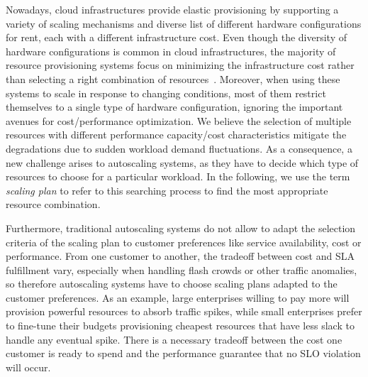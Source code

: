 Nowadays, cloud infrastructures provide elastic provisioning by supporting a variety of scaling mechanisms and diverse list of different hardware configurations for rent, each with a different infrastructure cost. Even though the diversity of hardware configurations is common in cloud infrastructures, the majority of resource provisioning systems focus on minimizing the infrastructure cost rather than selecting a right combination of resources~\cite{herbst_2013,urgaonkar_agile_2008,dejavu2012}. Moreover, when using these systems to scale in response to changing conditions, most of them restrict themselves to a single type of hardware configuration, ignoring the important avenues for cost/performance optimization. We believe the selection of multiple resources with different performance capacity/cost characteristics mitigate the degradations due to sudden workload demand fluctuations. As a consequence, a new challenge arises to autoscaling systems, as they have to decide which type of resources to choose for a particular workload. In the following, we use the term \emph{scaling plan} to refer to this searching process to find the most appropriate resource combination. 


Furthermore, traditional autoscaling systems do not allow to adapt the selection criteria of the scaling plan to customer preferences like service availability, cost or performance. From one customer to another, the tradeoff between cost and SLA fulfillment vary, especially when handling flash crowds or other traffic anomalies, so therefore autoscaling systems have to choose scaling plans adapted to the customer preferences. As an example, large enterprises willing to pay more will provision powerful resources to absorb traffic spikes, while small enterprises prefer to fine-tune their budgets provisioning cheapest resources that have less slack to handle any eventual spike. There is a necessary tradeoff between the cost one customer is ready to spend and the performance guarantee that no SLO violation will occur.



